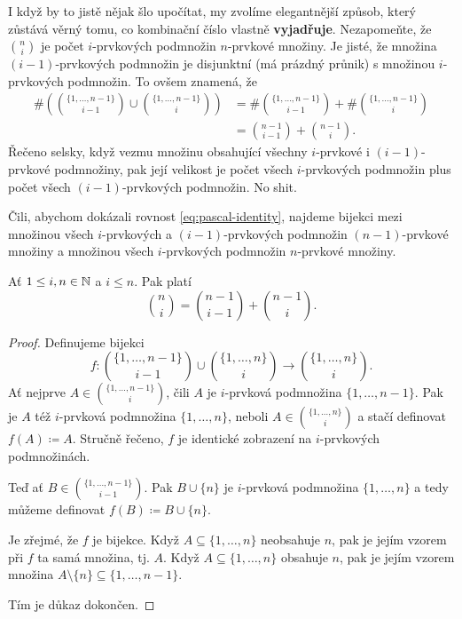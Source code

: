 I když by to jistě nějak šlo upočítat, my zvolíme elegantnější způsob, který
zůstává věrný tomu, co kombinační číslo vlastně \textbf{vyjadřuje}. Nezapomeňte,
že $\binom{n}{i}$ je počet $i$-prvkových podmnožin $n$-prvkové množiny. Je
jisté, že množina $(i-1)$-prvkových podmnožin je disjunktní (má prázdný průnik) s
množinou $i$-prvkových podmnožin. To ovšem znamená, že
\begin{align*}
 \# \left( \binom{\{1,\ldots,n-1\}}{i-1} \cup \binom{\{1,\ldots,n-1\}}{i}
 \right)
 &= \# \binom{\{1,\ldots,n-1\}}{i-1} + \# \binom{\{1,\ldots,n-1\}}{i}\\
 &= \binom{n-1}{i-1} + \binom{n-1}{i}.
\end{align*}
Řečeno selsky, když vezmu množinu obsahující všechny $i$-prvkové i
$(i-1)$-prvkové podmnožiny, pak její velikost je počet všech $i$-prvkových
podmnožin plus počet všech $(i-1)$-prvkových podmnožin. No shit.

Čili, abychom dokázali rovnost \eqref{eq:pascal-identity}, najdeme bijekci mezi
množinou všech $i$-prvkových a $(i-1)$-prvkových podmnožin $(n-1)$-prvkové
množiny a množinou všech  $i$-prvkových podmnožin $n$-prvkové množiny.

\begin{claim}
 \label{claim:pascalova-rovnost}
 Ať $1 \leq i,n \in \mathbb{N}$ a $i \leq n$. Pak platí
 \[
  \binom{n}{i} = \binom{n-1}{i-1} + \binom{n-1}{i}.
 \]
\end{claim}
\begin{proof}
 Definujeme bijekci
 \[ 
  f: \binom{\{1,\ldots,n-1\}}{i-1} \cup \binom{\{1,\ldots,n\}}{i} \to
  \binom{\{1,\ldots,n\}}{i}.
 \]
 Ať nejprve $A \in \binom{\{1,\ldots,n-1\}}{i}$, čili $A$ je $i$-prvková
 podmnožina ${\{1,\ldots,n-1\}}$. Pak je $A$ též $i$-prvková podmnožina
 $\{1,\ldots,n\}$, neboli $A \in \binom{\{1,\ldots,n\}}{i}$ a stačí definovat
 $f(A) \coloneqq A$. Stručně řečeno, $f$ je identické zobrazení na $i$-prvkových
 podmnožinách.

 Teď ať $B \in \binom{\{1,\ldots,n-1\}}{i-1}$. Pak $B \cup \{n\}$ je $i$-prvková
 podmnožina $\{1,\ldots,n\}$ a tedy můžeme definovat $f(B) \coloneqq B \cup
 \{n\}$.

 Je zřejmé, že $f$ je bijekce. Když $A \subseteq \{1,\ldots,n\}$ neobsahuje $n$,
 pak je jejím vzorem při $f$ ta samá množina, tj. $A$. Když $A \subseteq
 \{1,\ldots,n\}$ obsahuje $n$, pak je jejím vzorem množina $A \setminus
 \{n\} \subseteq \{1,\ldots,n-1\}$.

 Tím je důkaz dokončen.
\end{proof}

